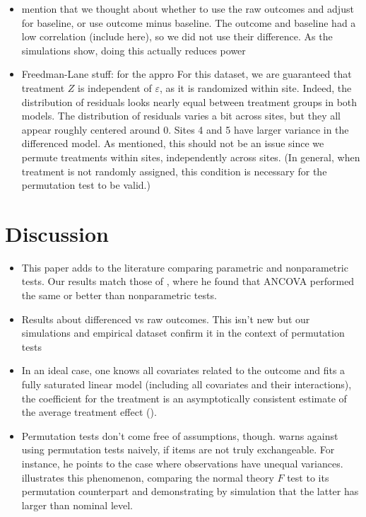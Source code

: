 \documentclass[11pt]{article}
\newcommand{\bit}{\begin{itemize}}
\newcommand{\eit}{\end{itemize}}
\begin{document}
\bit
\item mention that we thought about whether to use the raw outcomes and adjust for baseline, or use outcome minus baseline. The outcome and baseline had a low correlation (include here), so we did not use their difference. As the simulations show, doing this actually reduces power
\item Freedman-Lane stuff: for the appro
For this dataset, we are guaranteed that treatment $Z$ is independent of $\varepsilon$, as it is randomized within site.
Indeed, the distribution of residuals looks nearly equal between treatment groups in both models.
The distribution of residuals varies a bit across sites, but they all appear roughly centered around 0.
Sites 4 and 5 have larger variance in the differenced model.
As mentioned, this should not be an issue since we permute treatments within sites, independently across sites.
(In general, when treatment is not randomly assigned, this condition is necessary for the permutation test to be valid.)
\eit

\begin{center}

\end{center}

\section{Discussion}

\bit
\item This paper adds to the literature comparing parametric and nonparametric tests.
Our results match those of \citet{vickers_parametric_2005}, where he found that ANCOVA performed the same or better than nonparametric tests.
\item Results about differenced vs raw outcomes. This isn't new but our simulations and empirical dataset confirm it in the context of permutation tests
\item In an ideal case, one knows all covariates related to the outcome and fits a fully saturated linear model (including all covariates and their interactions), the coefficient for the treatment is an asymptotically consistent estimate of the average treatment effect (\cite{lin_agnostic_2013}).
\item Permutation tests don't come free of assumptions, though.  \citet{romano_behavior_1990} warns against using permutation tests naively, if items are not truly exchangeable. For instance, he points to the case where observations have unequal variances.  \citet{boik_fisherpitman_1987} illustrates this phenomenon, comparing the normal theory $F$ test to its permutation counterpart and demonstrating by simulation that the latter has larger than nominal level.
\eit
\end{document}

